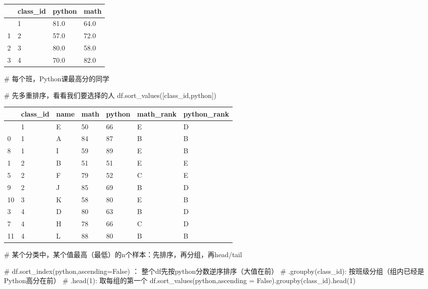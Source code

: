 \documentclass[
  letterpaper,
  DIV=11,
  numbers=noendperiod]{scrreprt}
\newenvironment{Shaded}{\begin{snugshade}}{\end{snugshade}}
\newcommand{\CommentTok}[1]{\textcolor[rgb]{0.37,0.37,0.37}{#1}}
\newcommand{\DecValTok}[1]{\textcolor[rgb]{0.68,0.00,0.00}{#1}}
\newcommand{\NormalTok}[1]{\textcolor[rgb]{0.00,0.23,0.31}{#1}}
\newcommand{\OperatorTok}[1]{\textcolor[rgb]{0.37,0.37,0.37}{#1}}
\newcommand{\StringTok}[1]{\textcolor[rgb]{0.13,0.47,0.30}{#1}}
\newcommand{\VariableTok}[1]{\textcolor[rgb]{0.07,0.07,0.07}{#1}}
\begin{document}
\begin{longtable}[]{@{}llll@{}}
\toprule\noalign{}
& class\_id & python & math \\
\midrule\noalign{}
\endhead
\bottomrule\noalign{}
\endlastfoot
0 & 1 & 81.0 & 64.0 \\
1 & 2 & 57.0 & 72.0 \\
2 & 3 & 80.0 & 58.0 \\
3 & 4 & 70.0 & 82.0 \\
\end{longtable}

\begin{Shaded}
\begin{Highlighting}[]
\CommentTok{\# 每个班，Python课最高分的同学}

\CommentTok{\# 先多重排序，看看我们要选择的人}
\NormalTok{df.sort\_values([}\StringTok{\textquotesingle{}class\_id\textquotesingle{}}\NormalTok{,}\StringTok{\textquotesingle{}python\textquotesingle{}}\NormalTok{]) }
\end{Highlighting}
\end{Shaded}

\begin{longtable}[]{@{}lllllll@{}}
\toprule\noalign{}
& class\_id & name & math & python & math\_rank & python\_rank \\
\midrule\noalign{}
\endhead
\bottomrule\noalign{}
\endlastfoot
4 & 1 & E & 50 & 66 & E & D \\
0 & 1 & A & 84 & 87 & B & B \\
8 & 1 & I & 59 & 89 & E & B \\
1 & 2 & B & 51 & 51 & E & E \\
5 & 2 & F & 79 & 52 & C & E \\
9 & 2 & J & 85 & 69 & B & D \\
10 & 3 & K & 58 & 80 & E & B \\
3 & 4 & D & 80 & 63 & B & D \\
7 & 4 & H & 78 & 66 & C & D \\
11 & 4 & L & 88 & 80 & B & B \\
\end{longtable}

\begin{Shaded}
\begin{Highlighting}[]
\CommentTok{\# 某个分类中，某个值最高（最低）的n个样本：先排序，再分组，再head/tail}

\CommentTok{\# df.sort\_index(\textquotesingle{}python\textquotesingle{},ascending=False) ： 整个df先按python分数逆序排序（大值在前）}
\CommentTok{\# .groupby(\textquotesingle{}class\_id\textquotesingle{}): 按班级分组（组内已经是Python高分在前）}
\CommentTok{\# .head(1): 取每组的第一个}
\NormalTok{df.sort\_values(}\StringTok{\textquotesingle{}python\textquotesingle{}}\NormalTok{,ascending }\OperatorTok{=} \VariableTok{False}\NormalTok{).groupby(}\StringTok{\textquotesingle{}class\_id\textquotesingle{}}\NormalTok{).head(}\DecValTok{1}\NormalTok{)}
\end{Highlighting}
\end{Shaded}
\end{document}
